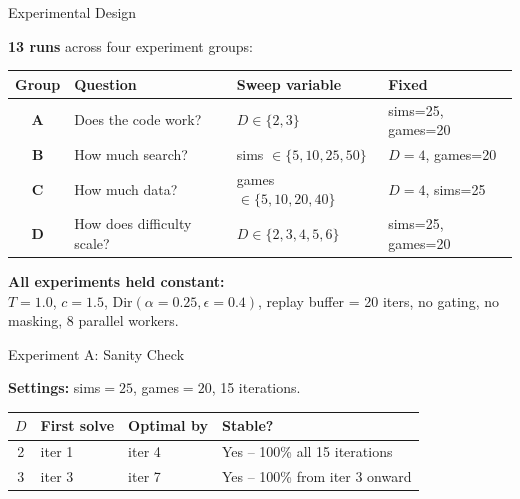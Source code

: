 \documentclass[aspectratio=169, 10pt]{beamer}
\begin{document}
\begin{frame}{Experimental Design}

\textbf{13 runs} across four experiment groups:

\vspace{0.3cm}
\centering
\begin{tabular}{clll}
\toprule
Group & Question & Sweep variable & Fixed \\
\midrule
\textbf{A} & Does the code work? & $D \in \{2, 3\}$ & sims=25, games=20 \\
\textbf{B} & How much search? & sims $\in \{5, 10, 25, 50\}$ & $D=4$, games=20 \\
\textbf{C} & How much data? & games $\in \{5, 10, 20, 40\}$ & $D=4$, sims=25 \\
\textbf{D} & How does difficulty scale? & $D \in \{2, 3, 4, 5, 6\}$ & sims=25, games=20 \\
\bottomrule
\end{tabular}

\vspace{0.5cm}
\textbf{All experiments held constant:}\\
{\small $T{=}1.0$, $c{=}1.5$, Dir$(\alpha{=}0.25, \epsilon{=}0.4)$, replay buffer = 20 iters, no gating, no masking, 8 parallel workers.}
\end{frame}

\begin{frame}{Experiment A: Sanity Check}

\textbf{Settings:} sims$=25$, games$=20$, 15 iterations.

\vspace{0.4cm}
\centering
\begin{tabular}{clll}
\toprule
$D$ & First solve & Optimal by & Stable? \\
\midrule
2 & iter 1 & iter 4 & \textcolor{success}{Yes -- 100\% all 15 iterations} \\
3 & iter 3 & iter 7 & \textcolor{success}{Yes -- 100\% from iter 3 onward} \\
\bottomrule
\end{tabular}

\vspace{0.6cm}
\begin{center}
\end{center}
\end{frame}
\end{document}
